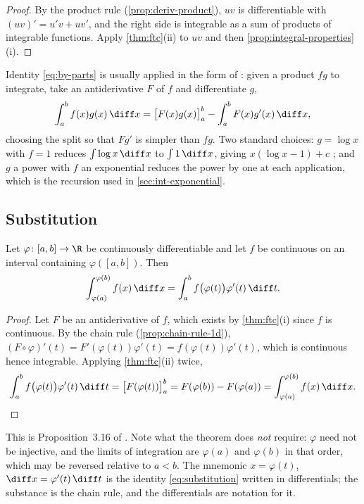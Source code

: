 \begin{proof}
	By the product rule (\autoref{prop:deriv-product}), $uv$ is differentiable with
	$(uv)'=u'v+uv'$, and the right side is integrable as a sum of products of
	integrable functions. Apply \autoref{thm:ftc}(ii) to $uv$ and then
	\autoref{prop:integral-properties}(i).
\end{proof}

Identity \eqref{eq:by-parts} is usually applied in the form of
\autocite[slide 71]{fukuda2026calculus}: given a product $fg$ to integrate, take
an antiderivative $F$ of $f$ and differentiate $g$,
\[
	\int_a^bf(x)g(x)\,\diff x=\bigl[F(x)g(x)\bigr]_a^b-\int_a^bF(x)g'(x)\,\diff x ,
\]
choosing the split so that $Fg'$ is simpler than $fg$. Two standard choices:
$g=\log x$ with $f=1$ reduces $\int\log x\,\diff x$ to $\int1\,\diff x$, giving
$x(\log x-1)+c$ \autocite[slide 78]{fukuda2026calculus}; and $g$ a power with
$f$ an exponential reduces the power by one at each application, which is the
recursion used in \autoref{sec:int-exponential}.

\subsection{Substitution}

\begin{theorem}\label{thm:substitution}
	Let $\varphi\colon[a,b]\to\R$ be continuously differentiable and let $f$ be
	continuous on an interval containing $\varphi([a,b])$. Then
	\begin{equation}\label{eq:substitution}
		\int_{\varphi(a)}^{\varphi(b)}f(x)\,\diff x=\int_a^bf\bigl(\varphi(t)\bigr)\varphi'(t)\,\diff t .
	\end{equation}
\end{theorem}

\begin{proof}
	Let $F$ be an antiderivative of $f$, which exists by \autoref{thm:ftc}(i) since
	$f$ is continuous. By the chain rule (\autoref{prop:chain-rule-1d}),
	$(F\circ\varphi)'(t)=F'(\varphi(t))\varphi'(t)=f(\varphi(t))\varphi'(t)$, which
	is continuous hence integrable. Applying \autoref{thm:ftc}(ii) twice,
	\[
		\int_a^bf\bigl(\varphi(t)\bigr)\varphi'(t)\,\diff t
		=\bigl[F(\varphi(t))\bigr]_a^b=F(\varphi(b))-F(\varphi(a))
		=\int_{\varphi(a)}^{\varphi(b)}f(x)\,\diff x .
	\]
\end{proof}

This is Proposition~3.16 of \textcite{fukuda2026notes}
\autocite[slide 82]{fukuda2026calculus}. Note what the theorem does \emph{not}
require: $\varphi$ need not be injective, and the limits of integration are
$\varphi(a)$ and $\varphi(b)$ in that order, which may be reversed relative to
$a<b$. The mnemonic $x=\varphi(t)$, $\diff x=\varphi'(t)\,\diff t$
\autocite[slide 81]{fukuda2026calculus} is the identity
\eqref{eq:substitution} written in differentials; the substance is the chain
rule, and the differentials are notation for it.

